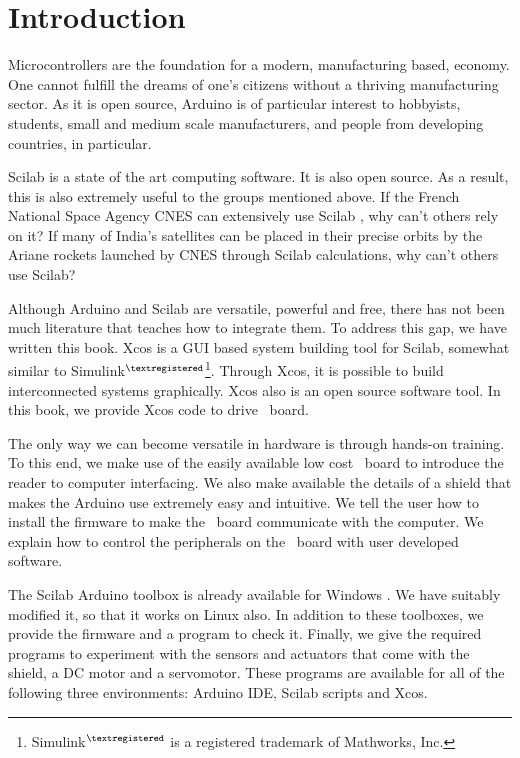 \chapter{Introduction}
\thispagestyle{empty}
\label{sec:intro}
Microcontrollers are the foundation for a modern, manufacturing based,
economy.  One cannot fulfill the dreams of one's citizens without a
thriving manufacturing sector.  As it is open source, Arduino is of
particular interest to hobbyists, students, small and medium scale
manufacturers, and people from developing countries, in particular.

Scilab is a state of the art computing software.  It is also open
source.  As a result, this is also extremely useful to the groups
mentioned above.  If the French National Space Agency CNES can
extensively use Scilab \cite{CNES-Scilab}, why can't others rely on
it?  If many of India's satellites can be placed in their precise
orbits by the Ariane rockets launched by CNES through Scilab
calculations, why can't others use Scilab?

Although Arduino and Scilab are versatile, powerful and free, there
has not been much literature that teaches how to integrate them.  To
address this gap, we have written this book.  Xcos is a GUI based
system building tool for Scilab, somewhat similar to
Simulink$^{\textregistered}$\footnote{Simulink$^{\textregistered}$ is
  a registered trademark of Mathworks, Inc.}.  Through Xcos, it is
possible to build interconnected systems graphically.  Xcos also is an
open source software tool.  In this book, we provide Xcos code to
drive \arduino\ board.

The only way we can become versatile in hardware is through hands-on
training.  To this end, we make use of the easily available low cost
\arduino\ board to introduce the reader to computer interfacing.  We
also make available the details of a shield that makes the Arduino use
extremely easy and intuitive.  We tell the user how to install the
firmware to make the \arduino\ board communicate with the computer.
We explain how to control the peripherals on the \arduino\ board with
user developed software.

The Scilab Arduino toolbox is already available for Windows
\cite{scilab-arduino}.  We have suitably modified it, so that it works
on Linux also.  In addition to these toolboxes, we provide the
firmware and a program to check it.  Finally, we give the required
programs to experiment with the sensors and actuators that come with
the shield, a DC motor and a servomotor.  These programs are available
for all of the following three environments: Arduino IDE, Scilab
scripts and Xcos.

